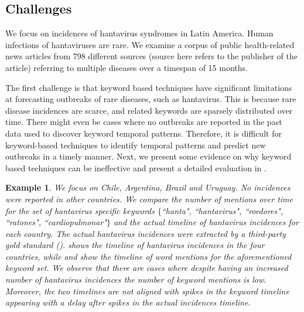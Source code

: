 \documentclass[twoside,leqno,twocolumn]{article}
\newtheorem{example}{Example}
\begin{document}
\subsection{Challenges}
\label{sec:challenges}
We focus on incidences of hantavirus syndromes in Latin America. Human
infections of hantaviruses are rare. We examine a corpus of public
health-related news articles from 798 different sources (source here
refers to the publisher of the article) referring to multiple diseases over a timespan of 15 months. 

The first challenge is that keyword based techniques have significant limitations at forecasting outbreaks of rare diseases, such as hantavirus. This is because rare disease incidences are scarce, and related keywords are sparsely distributed over time.  There might even be cases where no outbreaks are reported in the past data used to discover keyword temporal patterns. Therefore, it is difficult for keyword-based techniques to identify temporal patterns and predict new outbreaks in a timely manner. Next, we present some evidence on why keyword based techniques can be ineffective and present a detailed evaluation in .

\begin{example}
We focus on Chile, Argentina, Brazil and Uruguay. No incidences were reported in other countries. We compare the number of mentions over time for the set of hantavirus specific keywords $\{$``hanta", ``hantavirus", ``roedores", ``ratones", ``cardiopulmonar"$\}$ and the actual timeline of hantavirus incidences for each country. The actual hantavirus incidences were extracted by a third-party gold standard ().   shows the timeline of hantavirus incidences in the four countries, while  and  show the timeline of word mentions for the aforementioned keyword set. We observe that there are cases where despite having an increased number of hantavirus incidences the number of keyword mentions is low. Moreover, the two timelines are not aligned with spikes in the keyword timeline appearing with a delay after spikes in the actual incidences timeline.
\end{example}
\end{document}
